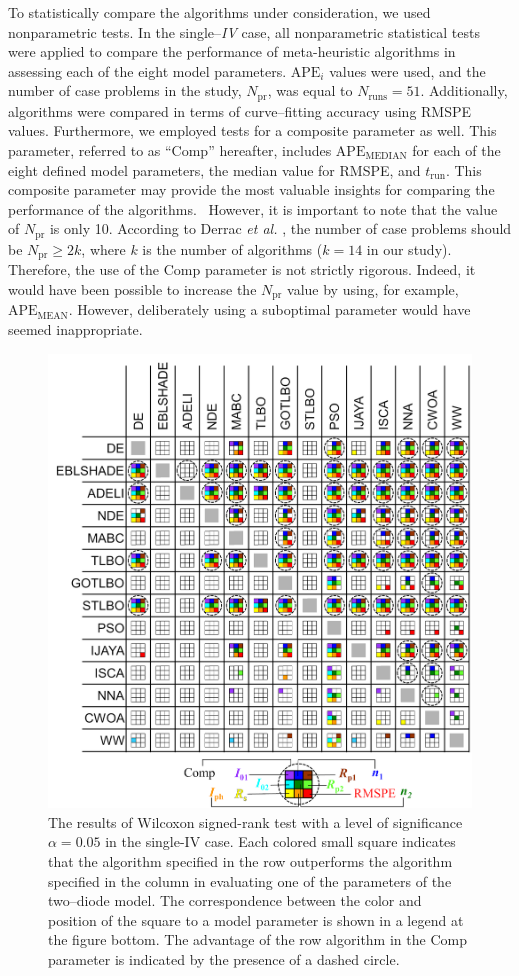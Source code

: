 \documentclass[a4paper,fleqn]{cas-sc}
\begin{document}
To statistically compare the algorithms under consideration, we used nonparametric tests.
In the single--\emph{IV} case, all nonparametric statistical tests were applied to compare the performance
of meta-heuristic algorithms in assessing each of the eight model parameters.
$\mathrm{APE}_i$ values were used, and the number of case problems in the study, $N_\mathrm{pr}$, was equal to $N_\mathrm{runs}=51$.
Additionally, algorithms were compared in terms of curve--fitting accuracy using RMSPE values.
Furthermore, we employed tests for a composite parameter as well.
This parameter, referred to as ``Comp'' hereafter,
includes $\mathrm{APE}_\mathrm{MEDIAN}$ for each of the eight defined model parameters,
the median value for RMSPE, and $t_\mathrm{run}$.
This composite parameter may provide the most valuable insights for comparing the performance of the algorithms. 
However, it is important to note that the value of $N_\mathrm{pr}$ is only 10.
According to Derrac \emph{et al.} \cite{Derrac2011}, the number of case problems should be $N_\mathrm{pr}\geq 2k$,
where $k$ is the number of algorithms ($k=14$ in our study).
Therefore, the use of the Comp parameter is not strictly rigorous.
Indeed, it would have been possible to increase the $N_\mathrm{pr}$ value by using,
for example, $\mathrm{APE}_\mathrm{MEAN}$.
However, deliberately using a suboptimal parameter would have seemed inappropriate.



\begin{figure}[]
	\centering
		\includegraphics[width=0.45\columnwidth]{Fig5}
	  \caption{The results of Wilcoxon signed-rank test with a level of significance $\alpha = 0.05$ in the single-IV case.
               Each colored small square indicates that the algorithm specified in the row outperforms the algorithm
               specified in the column in evaluating one of the parameters of the two--diode model.
               The correspondence between the color and position of the square to a model parameter
               is shown in a legend at the figure bottom.
               The advantage of the row algorithm in the Comp parameter is indicated by the presence of a dashed circle.}\label{figWilSingleIV}
\end{figure}
\end{document}
